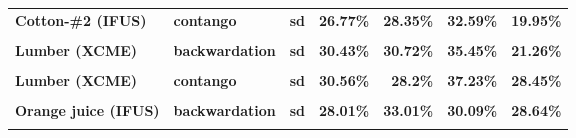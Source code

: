 \documentclass[
  authoryear,
  preprint,
  3p]{elsarticle}
\begin{document}
\begin{longtable}[t]{>{}l>{}l>{}l>{}r>{}r>{}r>{}r}
\textbf{Cotton-\#2 (IFUS)} & \textbf{contango} & \textbf{sd} & \textcolor[HTML]{4285f4}{\textbf{26.77\%}} & \textcolor[HTML]{4285f4}{\textbf{28.35\%}} & \textcolor[HTML]{4285f4}{\textbf{32.59\%}} & \textcolor[HTML]{4285f4}{\textbf{19.95\%}}\\
\textbf{\cellcolor{gray!10}{Lumber (XCME)}} & \textbf{\cellcolor{gray!10}{backwardation}} & \textbf{\cellcolor{gray!10}{mean}} & \textcolor[HTML]{4285f4}{\textbf{\cellcolor{gray!10}{-8.48\%}}} & \textcolor[HTML]{4285f4}{\textbf{\cellcolor{gray!10}{-2.37\%}}} & \textcolor[HTML]{4285f4}{\textbf{\cellcolor{gray!10}{29.11\%}}} & \textcolor[HTML]{4285f4}{\textbf{\cellcolor{gray!10}{**26.99\%}}}\\
\textbf{Lumber (XCME)} & \textbf{backwardation} & \textbf{sd} & \textcolor[HTML]{4285f4}{\textbf{30.43\%}} & \textcolor[HTML]{4285f4}{\textbf{30.72\%}} & \textcolor[HTML]{4285f4}{\textbf{35.45\%}} & \textcolor[HTML]{4285f4}{\textbf{21.26\%}}\\
\addlinespace
\textbf{\cellcolor{gray!10}{Lumber (XCME)}} & \textbf{\cellcolor{gray!10}{contango}} & \textbf{\cellcolor{gray!10}{mean}} & \textcolor[HTML]{4285f4}{\textbf{\cellcolor{gray!10}{11.68\%}}} & \textcolor[HTML]{4285f4}{\textbf{\cellcolor{gray!10}{-4.77\%}}} & \textcolor[HTML]{4285f4}{\textbf{\cellcolor{gray!10}{-5.04\%}}} & \textcolor[HTML]{4285f4}{\textbf{\cellcolor{gray!10}{-17.14\%}}}\\
\textbf{Lumber (XCME)} & \textbf{contango} & \textbf{sd} & \textcolor[HTML]{4285f4}{\textbf{30.56\%}} & \textcolor[HTML]{4285f4}{\textbf{28.2\%}} & \textcolor[HTML]{4285f4}{\textbf{37.23\%}} & \textcolor[HTML]{4285f4}{\textbf{28.45\%}}\\
\textbf{\cellcolor{gray!10}{Orange juice (IFUS)}} & \textbf{\cellcolor{gray!10}{backwardation}} & \textbf{\cellcolor{gray!10}{mean}} & \textcolor[HTML]{4285f4}{\textbf{\cellcolor{gray!10}{-2.38\%}}} & \textcolor[HTML]{4285f4}{\textbf{\cellcolor{gray!10}{-2.22\%}}} & \textcolor[HTML]{4285f4}{\textbf{\cellcolor{gray!10}{18.24\%}}} & \textcolor[HTML]{4285f4}{\textbf{\cellcolor{gray!10}{18.64\%}}}\\
\textbf{Orange juice (IFUS)} & \textbf{backwardation} & \textbf{sd} & \textcolor[HTML]{4285f4}{\textbf{28.01\%}} & \textcolor[HTML]{4285f4}{\textbf{33.01\%}} & \textcolor[HTML]{4285f4}{\textbf{30.09\%}} & \textcolor[HTML]{4285f4}{\textbf{28.64\%}}\\
\textbf{\cellcolor{gray!10}{Orange juice (IFUS)}} & \textbf{\cellcolor{gray!10}{contango}} & \textbf{\cellcolor{gray!10}{mean}} & \textcolor[HTML]{4285f4}{\textbf{\cellcolor{gray!10}{5.83\%}}} & \textcolor[HTML]{4285f4}{\textbf{\cellcolor{gray!10}{29.93\%}}} & \textcolor[HTML]{4285f4}{\textbf{\cellcolor{gray!10}{12.29\%}}} & \textcolor[HTML]{4285f4}{\textbf{\cellcolor{gray!10}{-8.64\%}}}\\

\end{longtable}
\end{document}
